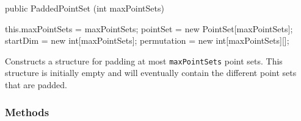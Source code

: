 \begin{code}

   public PaddedPointSet (int maxPointSets) \begin{hide} {
      this.maxPointSets = maxPointSets;
      pointSet = new PointSet[maxPointSets];
      startDim = new int[maxPointSets];
      permutation = new int[maxPointSets][];
   }\end{hide}
\end{code}
 \begin{tabb}
   Constructs a structure for padding at most \texttt{maxPointSets} point sets.
   This structure is initially empty and will eventually contain the different
   point sets that are padded. 
 \end{tabb}
\begin{htmlonly}
\end{htmlonly}

\subsubsection*{Methods}

